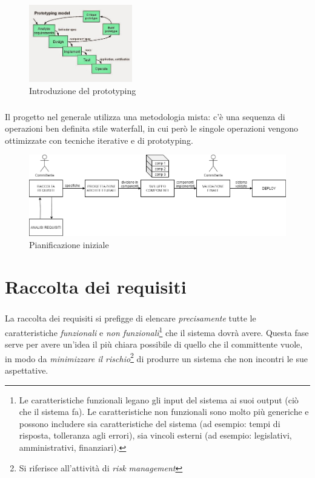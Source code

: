 \documentclass[12pt,a4paper,twoside,english,italian]{book}
\begin{document}
\begin{figure}[H]
    \centering
    \includegraphics[width=0.4\textwidth]{img/prototyping.jpg}
    \caption{Introduzione del prototyping}
\end{figure}

\paragraph{} Il progetto nel generale utilizza una metodologia mista: c'è una sequenza di operazioni ben definita stile waterfall, in cui però le singole operazioni vengono ottimizzate con tecniche iterative e di prototyping. 

\begin{figure}[H]
    \centering
    \includegraphics[width=1\textwidth]{img/pianificazione iniziale.png}
    \caption{Pianificazione iniziale}
\end{figure}


\chapter{Raccolta dei requisiti}

\paragraph{} La raccolta dei requisiti \cite{req_analysis} si prefigge di elencare \emph{precisamente} tutte le caratteristiche \emph {funzionali} e \emph{non funzionali}\footnote{Le caratteristiche funzionali legano gli input del sistema ai suoi output (ciò che il sistema fa). Le caratteristiche non funzionali sono molto più generiche e possono includere sia caratteristiche del sistema (ad esempio: tempi di risposta, tolleranza agli errori), sia vincoli esterni (ad esempio: legislativi, amministrativi, finanziari).} che il sistema dovrà avere. Questa fase serve per avere un'idea il più chiara possibile di quello che il committente vuole, in modo da \emph{minimizzare il rischio}\footnote{Si riferisce all'attività di \emph{risk management}} di produrre un sistema che non incontri le sue aspettative.
\end{document}
